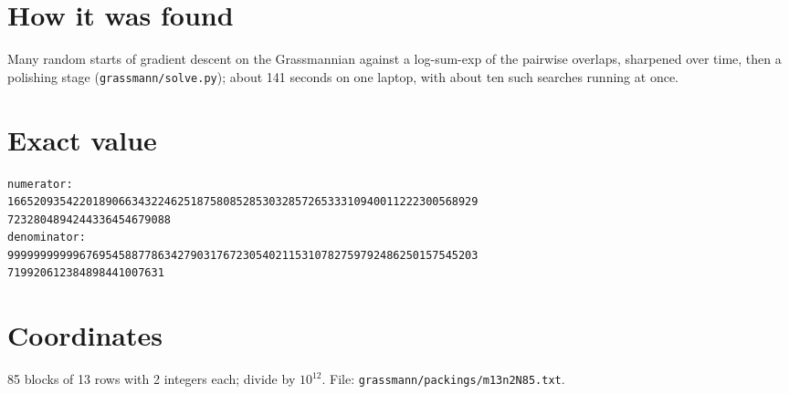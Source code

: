 \documentclass[11pt,a4paper]{article}
\begin{document}
\section{How it was found}
Many random starts of gradient descent on the Grassmannian against a log-sum-exp of the pairwise overlaps, sharpened over time, then a polishing stage (\texttt{grassmann/solve.py}); about 141 seconds on one laptop, with about ten such searches running at once.


\appendix
\section{Exact value}
{\small
\begin{verbatim}
numerator:
166520935422018906634322462518758085285303285726533310940011222300568929
7232804894244336454679088
denominator:
999999999996769545887786342790317672305402115310782759792486250157545203
719920612384898441007631
\end{verbatim}}

\section{Coordinates}
85 blocks of 13 rows with 2 integers each; divide by $10^{12}$. File: \texttt{grassmann/packings/m13n2N85.txt}.
{\tiny
\begin{multicols}{4}
\end{multicols}}
\end{document}
